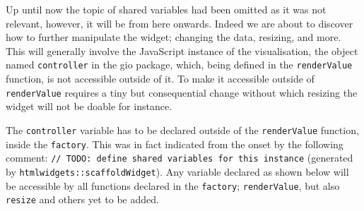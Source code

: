 \documentclass[
]{krantz}
\begin{document}
Up until now the topic of shared variables had been omitted as it was not relevant, however, it will be from here onwards. Indeed we are about to discover how to further manipulate the widget; changing the data, resizing, and more. This will generally involve the JavaScript instance of the visualisation, the object named \texttt{controller} in the gio package, which, being defined in the \texttt{renderValue} function, is not accessible outside of it. To make it accessible outside of \texttt{renderValue} requires a tiny but consequential change without which resizing the widget will not be doable for instance.

The \texttt{controller} variable has to be declared outside of the \texttt{renderValue} function, inside the \texttt{factory}. This was in fact indicated from the onset by the following comment: \texttt{//\ TODO:\ define\ shared\ variables\ for\ this\ instance} (generated by \texttt{htmlwidgets::scaffoldWidget}). Any variable declared as shown below will be accessible by all functions declared in the \texttt{factory}; \texttt{renderValue}, but also \texttt{resize} and others yet to be added.
\end{document}
